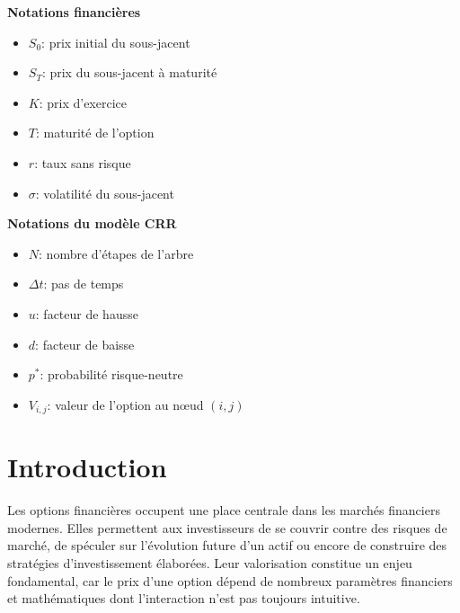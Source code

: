 \documentclass[11pt]{report}
\begin{document}
\begin{center}
	\begin{minipage}[t]{0.49\textwidth}
		\textbf{Notations financières}
		\begin{itemize}[noitemsep]
			\raggedright
			\item $S_0$: prix initial du sous-jacent
			\item $S_T$: prix du sous-jacent à maturité
			\item $K$: prix d’exercice
			\item $T$: maturité de l’option
			\item $r$: taux sans risque
			\item $\sigma$: volatilité du sous-jacent
		\end{itemize}
	\end{minipage}
	\hfill
	\begin{minipage}[t]{0.49\textwidth}
		\textbf{Notations du modèle CRR}
		\begin{itemize}[noitemsep]
			\raggedright
			\item $N$: nombre d’étapes de l’arbre
			\item $\Delta t$: pas de temps
			\item $u$: facteur de hausse
			\item $d$: facteur de baisse
			\item $p^*$: probabilité risque-neutre
			\item $V_{i,j}$: valeur de l’option au nœud $(i,j)$
		\end{itemize}
	\end{minipage}
\end{center}

\newpage


\chapter*{Introduction}

Les options financières occupent une place centrale dans les marchés financiers modernes. Elles permettent aux investisseurs de se couvrir contre des risques de marché, de spéculer sur l'évolution future d'un actif ou encore de construire des stratégies d'investissement élaborées. Leur valorisation constitue un enjeu fondamental, car le prix d'une option dépend de nombreux paramètres financiers et mathématiques dont l'interaction n'est pas toujours intuitive.
\end{document}
